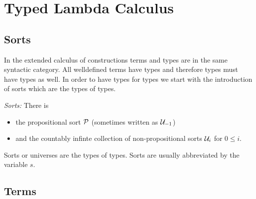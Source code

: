 \section{Typed Lambda Calculus}






\subsection{Sorts}


In the extended calculus of constructions terms and types are in the same
syntactic category. All welldefined terms have types and therefore types must
have types as well. In order to have types for types we start with the
introduction of sorts which are the types of types.

\begin{definition}
    \emph{Sorts:}
    There is
    \begin{itemize}
        \item the propositional sort ${\cal P}$ (sometimes written as ${\cal U}_{-1}$)
    \item and the countably infinte collection of
    non-propositional sorts ${\cal U}_i$ for $0 \le i$.
    \end{itemize}

    Sorts or universes are the types of types. Sorts are usually abbreviated by
    the variable $s$.
\end{definition}





\subsection{Terms}

